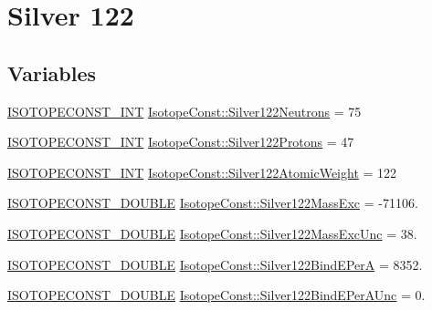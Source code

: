 \hypertarget{group___isotope_const-_silver-_ag122}{}\section{Silver 122}
\label{group___isotope_const-_silver-_ag122}
\subsection*{Variables}
\begin{DoxyCompactItemize}
\item 
\mbox{\hyperlink{group___isotope_const-_macros_ga5f18360b3e99483a35c32d789e62621c}{I\+S\+O\+T\+O\+P\+E\+C\+O\+N\+S\+T\+\_\+\+I\+NT}} \mbox{\hyperlink{group___isotope_const-_silver-_ag122_ga1c31845182fc6b5fbe7da2a2519e2bfa}{Isotope\+Const\+::\+Silver122\+Neutrons}} = 75
\item 
\mbox{\hyperlink{group___isotope_const-_macros_ga5f18360b3e99483a35c32d789e62621c}{I\+S\+O\+T\+O\+P\+E\+C\+O\+N\+S\+T\+\_\+\+I\+NT}} \mbox{\hyperlink{group___isotope_const-_silver-_ag122_gac91db142afce99dbd621c78771fea59b}{Isotope\+Const\+::\+Silver122\+Protons}} = 47
\item 
\mbox{\hyperlink{group___isotope_const-_macros_ga5f18360b3e99483a35c32d789e62621c}{I\+S\+O\+T\+O\+P\+E\+C\+O\+N\+S\+T\+\_\+\+I\+NT}} \mbox{\hyperlink{group___isotope_const-_silver-_ag122_ga49cf62c5e7ffe343f057d7b5a113df96}{Isotope\+Const\+::\+Silver122\+Atomic\+Weight}} = 122
\item 
\mbox{\hyperlink{group___isotope_const-_macros_ga8f45a7272ce02c0b4c65c44636ed719a}{I\+S\+O\+T\+O\+P\+E\+C\+O\+N\+S\+T\+\_\+\+D\+O\+U\+B\+LE}} \mbox{\hyperlink{group___isotope_const-_silver-_ag122_gabaa33942f00f9397dd87b267b3da470c}{Isotope\+Const\+::\+Silver122\+Mass\+Exc}} = -\/71106.
\item 
\mbox{\hyperlink{group___isotope_const-_macros_ga8f45a7272ce02c0b4c65c44636ed719a}{I\+S\+O\+T\+O\+P\+E\+C\+O\+N\+S\+T\+\_\+\+D\+O\+U\+B\+LE}} \mbox{\hyperlink{group___isotope_const-_silver-_ag122_ga334f8024497c640ccedcba6c7af735bb}{Isotope\+Const\+::\+Silver122\+Mass\+Exc\+Unc}} = 38.
\item 
\mbox{\hyperlink{group___isotope_const-_macros_ga8f45a7272ce02c0b4c65c44636ed719a}{I\+S\+O\+T\+O\+P\+E\+C\+O\+N\+S\+T\+\_\+\+D\+O\+U\+B\+LE}} \mbox{\hyperlink{group___isotope_const-_silver-_ag122_gacd432b7cc7384d4b6045ea495d1b3286}{Isotope\+Const\+::\+Silver122\+Bind\+E\+PerA}} = 8352.
\item 
\mbox{\hyperlink{group___isotope_const-_macros_ga8f45a7272ce02c0b4c65c44636ed719a}{I\+S\+O\+T\+O\+P\+E\+C\+O\+N\+S\+T\+\_\+\+D\+O\+U\+B\+LE}} \mbox{\hyperlink{group___isotope_const-_silver-_ag122_ga6892239eaf8fe50cc0a0b7bc9d76daa5}{Isotope\+Const\+::\+Silver122\+Bind\+E\+Per\+A\+Unc}} = 0.

\end{DoxyCompactItemize}
